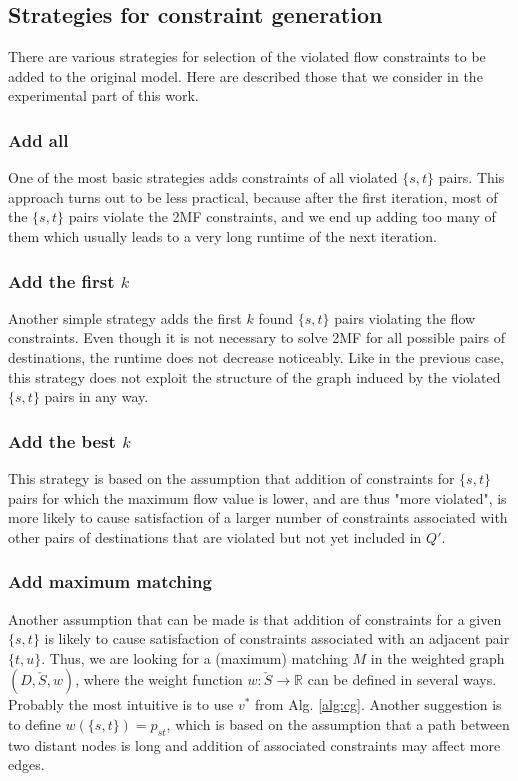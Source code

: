\subsection{Strategies for constraint generation}

There are various strategies for selection of the violated flow constraints to be added to the original model.
Here are described those that we consider in the experimental part of this work.

\subsubsection{Add all}

One of the most basic strategies adds constraints of all violated $\{s,t\}$ pairs.
This approach turns out to be less practical, because after the first iteration, most of the $\{s,t\}$ pairs violate the 2MF constraints, and we end up adding too many of them which usually leads to a very long runtime of the next iteration.

\subsubsection{Add the first $k$}

Another simple strategy adds the first $k$ found $\{s,t\}$ pairs violating the flow constraints.
Even though it is not necessary to solve 2MF for all possible pairs of destinations, the runtime does not decrease noticeably.
Like in the previous case, this strategy does not exploit the structure of the graph induced by the violated $\{s,t\}$ pairs in any way.

\subsubsection{Add the best $k$}

This strategy is based on the assumption that addition of constraints for $\{s,t\}$ pairs for which the maximum flow value is lower, and are thus "more violated", is more likely to cause satisfaction of a larger number of constraints associated with other pairs of destinations that are violated but not yet included in $Q'$.

\subsubsection{Add maximum matching}

Another assumption that can be made is that addition of constraints for a given $\{s,t\}$ is likely to cause satisfaction of constraints associated with an adjacent pair $\{t,u\}$.
Thus, we are looking for a (maximum) matching $M$ in the weighted graph $(D,\check{S},w)$, where the weight function $w:\check{S}\to\mathbb{R}$ can be defined in several ways.
Probably the most intuitive is to use $v^*$ from Alg. \ref{alg:cg}.
Another suggestion is to define $w(\{s,t\})=p_{st}$, which is based on the assumption that a path between two distant nodes is long and addition of associated constraints may affect more edges.

%
%
%
